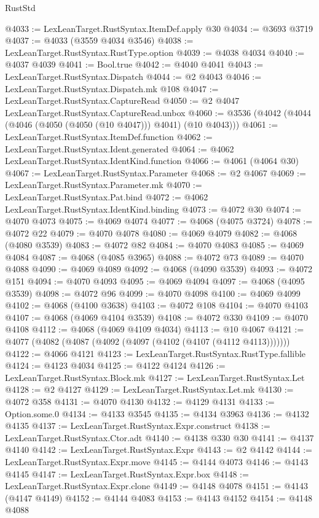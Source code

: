 \begin{lexlean}{RustStd}
\begin{coremodule}
@4033 := LexLeanTarget.RustSyntax.ItemDef.apply @30
@4034 := @3693 @3719
@4037 := @4033 (@3559 @4034 @3546)
@4038 := LexLeanTarget.RustSyntax.RustType.option
@4039 := @4038 @4034
@4040 := @4037 @4039
@4041 := Bool.true
@4042 := @4040 @4041
@4043 := LexLeanTarget.RustSyntax.Dispatch
@4044 := @2 @4043
@4046 := LexLeanTarget.RustSyntax.Dispatch.mk @108
@4047 := LexLeanTarget.RustSyntax.CaptureRead
@4050 := @2 @4047 LexLeanTarget.RustSyntax.CaptureRead.unbox
@4060 := @3536 (@4042 (@4044 (@4046 (@4050 (@4050 (@10 @4047))) @4041) (@10 @4043)))
@4061 := LexLeanTarget.RustSyntax.ItemDef.function
@4062 := LexLeanTarget.RustSyntax.Ident.generated
@4064 := @4062 LexLeanTarget.RustSyntax.IdentKind.function
@4066 := @4061 (@4064 @30)
@4067 := LexLeanTarget.RustSyntax.Parameter
@4068 := @2 @4067
@4069 := LexLeanTarget.RustSyntax.Parameter.mk
@4070 := LexLeanTarget.RustSyntax.Pat.bind
@4072 := @4062 LexLeanTarget.RustSyntax.IdentKind.binding
@4073 := @4072 @30
@4074 := @4070 @4073
@4075 := @4069 @4074
@4077 := @4068 (@4075 @3724)
@4078 := @4072 @22
@4079 := @4070 @4078
@4080 := @4069 @4079
@4082 := @4068 (@4080 @3539)
@4083 := @4072 @82
@4084 := @4070 @4083
@4085 := @4069 @4084
@4087 := @4068 (@4085 @3965)
@4088 := @4072 @73
@4089 := @4070 @4088
@4090 := @4069 @4089
@4092 := @4068 (@4090 @3539)
@4093 := @4072 @151
@4094 := @4070 @4093
@4095 := @4069 @4094
@4097 := @4068 (@4095 @3539)
@4098 := @4072 @96
@4099 := @4070 @4098
@4100 := @4069 @4099
@4102 := @4068 (@4100 @3638)
@4103 := @4072 @108
@4104 := @4070 @4103
@4107 := @4068 (@4069 @4104 @3539)
@4108 := @4072 @330
@4109 := @4070 @4108
@4112 := @4068 (@4069 @4109 @4034)
@4113 := @10 @4067
@4121 := @4077 (@4082 (@4087 (@4092 (@4097 (@4102 (@4107 (@4112 @4113)))))))
@4122 := @4066 @4121
@4123 := LexLeanTarget.RustSyntax.RustType.fallible
@4124 := @4123 @4034
@4125 := @4122 @4124
@4126 := LexLeanTarget.RustSyntax.Block.mk
@4127 := LexLeanTarget.RustSyntax.Let
@4128 := @2 @4127
@4129 := LexLeanTarget.RustSyntax.Let.mk
@4130 := @4072 @358
@4131 := @4070 @4130
@4132 := @4129 @4131
@4133 := Option.some.{0}
@4134 := @4133 @3545
@4135 := @4134 @3963
@4136 := @4132 @4135
@4137 := LexLeanTarget.RustSyntax.Expr.construct
@4138 := LexLeanTarget.RustSyntax.Ctor.adt
@4140 := @4138 @330 @30
@4141 := @4137 @4140
@4142 := LexLeanTarget.RustSyntax.Expr
@4143 := @2 @4142
@4144 := LexLeanTarget.RustSyntax.Expr.move
@4145 := @4144 @4073
@4146 := @4143 @4145
@4147 := LexLeanTarget.RustSyntax.Expr.box
@4148 := LexLeanTarget.RustSyntax.Expr.clone
@4149 := @4148 @4078
@4151 := @4143 (@4147 @4149)
@4152 := @4144 @4083
@4153 := @4143 @4152
@4154 := @4148 @4088

\end{coremodule}
\end{lexlean}
